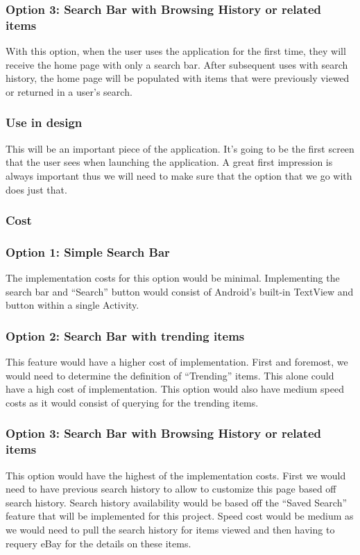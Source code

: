 \documentclass[journal,compsoc, 10pt, draftclsnofoot, onecolumn]{IEEEtran}
\begin{document}
\subsubsection*{Option 3: Search Bar with Browsing History or related items}
With this option, when the user uses the application for the first time, they 
will receive the home page with only a search bar. After subsequent uses with 
search history, the home page will be populated with items that were previously 
viewed or returned in a user's search.  
\subsubsection{Use in design}
This will be an important piece of the application. It's going to be the first 
screen that the user sees when launching the application. A great first 
impression is always important thus we will need to make sure that the option 
that we go with does just that.
\subsubsection{Cost}
\subsubsection*{Option 1: Simple Search Bar}
The implementation costs for this option would be minimal. Implementing the 
search bar and ``Search'' button would consist of Android's built-in TextView 
and button within a single Activity. 
\subsubsection*{Option 2: Search Bar with trending items}
This feature would have a higher cost of implementation. First and foremost, we 
would need to determine the definition of ``Trending'' items. This alone could 
have a high cost of implementation. This option would also have medium speed 
costs as it would consist of querying for the trending items.
\subsubsection*{Option 3: Search Bar with Browsing History or related items}
This option would have the highest of the implementation costs. First we would 
need to have previous search history to allow to customize this page based off 
search history. Search history availability would be based off the ``Saved 
Search'' feature that will be implemented for this project. Speed cost would 
be medium as we would need to pull the search history for items viewed and then 
having to requery eBay for the details on these items. 
\end{document}
